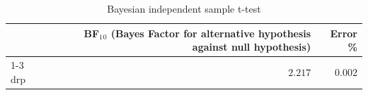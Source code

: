 \begin{table}[ht]
	\centering
	\caption{Bayesian independent sample t-test}
	\label{tab:bayesianTtest}
	{
		\begin{tabular}{lrr}
			\toprule
			    & BF$_{1}$$_{0}$ (Bayes Factor for alternative hypothesis against null hypothesis) & Error \% \\
				\cmidrule[0.4pt]{1-3}
			drp & $2.217$                                                                          & $0.002$  \\
			\bottomrule
		\end{tabular}
	}
\end{table}
